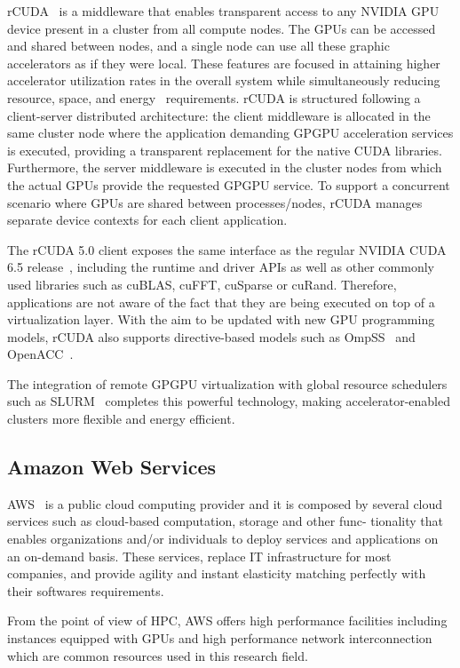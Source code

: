 \documentclass[a4paper,twoside]{article}
\begin{document}
{rCUDA}~\cite{tonithesis,toniparco} is a middleware that enables transparent access
to any NVIDIA GPU device present in a cluster from all compute
nodes. The GPUs can be accessed and shared between nodes, and a single node can use all these graphic accelerators
as if they were local.
These features are focused in attaining higher accelerator utilization rates in the overall system while simultaneously reducing
resource, space, and energy~\cite{energy14} requirements.
rCUDA is structured following a client-server distributed
architecture: the client middleware is allocated in the same cluster node where the application demanding GPGPU
acceleration services is executed, providing a transparent replacement for the
native CUDA libraries. Furthermore, the server middleware is executed in the
cluster nodes from which the actual GPUs provide the requested GPGPU service.
To support a concurrent scenario where GPUs are shared between
processes\slash nodes, {rCUDA} manages separate device contexts for
each client application.

The {rCUDA} 5.0 client exposes the same interface as the regular NVIDIA
CUDA 6.5 release~\cite{cuda65}, including the runtime and driver
APIs as well as other commonly used libraries such as cuBLAS, cuFFT, cuSparse or cuRand.
Therefore, applications are not aware of the fact that they are being executed
on top of a virtualization layer.
With the aim to be updated with new GPU programming models, {rCUDA} also supports
directive-based models such as OmpSS~\cite{repara15} and OpenACC~\cite{cluster15}.

The integration of remote GPGPU virtualization with global
resource schedulers such as SLURM~\cite{sbacpad14} completes this powerful
technology, making accelerator-enabled clusters more flexible and
energy efficient.

\subsection{Amazon Web Services}
\label{sec:aws}
AWS~\cite{aws} is a public cloud computing provider
and it is composed by several cloud services such as 
 cloud-based computation, storage and other func-
tionality that enables organizations and/or individuals to deploy
services and applications on an on-demand basis. 
These services, replace IT infrastructure for most companies, and provide agility and instant elasticity matching 
perfectly with their softwares requirements.

From the point of view of HPC, AWS offers high performance facilities including 
instances equipped with GPUs and high performance network interconnection which 
are common resources used in this research field.
\end{document}
